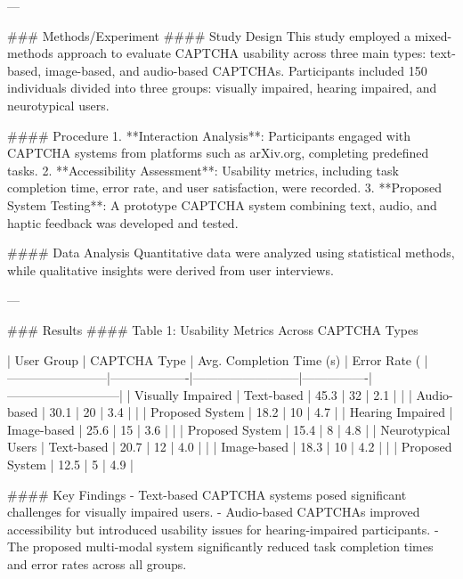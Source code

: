 ---

### Methods/Experiment  
#### Study Design  
This study employed a mixed-methods approach to evaluate CAPTCHA usability across three main types: text-based, image-based, and audio-based CAPTCHAs. Participants included 150 individuals divided into three groups: visually impaired, hearing impaired, and neurotypical users.

#### Procedure  
1. **Interaction Analysis**: Participants engaged with CAPTCHA systems from platforms such as arXiv.org, completing predefined tasks.  
2. **Accessibility Assessment**: Usability metrics, including task completion time, error rate, and user satisfaction, were recorded.  
3. **Proposed System Testing**: A prototype CAPTCHA system combining text, audio, and haptic feedback was developed and tested.  

#### Data Analysis  
Quantitative data were analyzed using statistical methods, while qualitative insights were derived from user interviews.

---

### Results  
#### Table 1: Usability Metrics Across CAPTCHA Types  

| User Group             | CAPTCHA Type      | Avg. Completion Time (s) | Error Rate (%
|------------------------|-------------------|--------------------------|----------------|---------------------------|
| Visually Impaired      | Text-based        | 45.3                     | 32             | 2.1                       |
|                        | Audio-based       | 30.1                     | 20             | 3.4                       |
|                        | Proposed System   | 18.2                     | 10             | 4.7                       |
| Hearing Impaired       | Image-based       | 25.6                     | 15             | 3.6                       |
|                        | Proposed System   | 15.4                     | 8              | 4.8                       |
| Neurotypical Users     | Text-based        | 20.7                     | 12             | 4.0                       |
|                        | Image-based       | 18.3                     | 10             | 4.2                       |
|                        | Proposed System   | 12.5                     | 5              | 4.9                       |

#### Key Findings  
- Text-based CAPTCHA systems posed significant challenges for visually impaired users.  
- Audio-based CAPTCHAs improved accessibility but introduced usability issues for hearing-impaired participants.  
- The proposed multi-modal system significantly reduced task completion times and error rates across all groups.  

